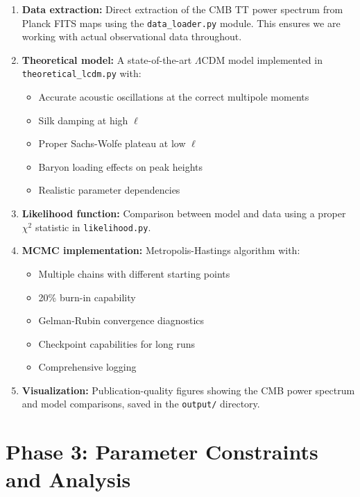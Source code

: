 \documentclass[11pt]{article}
\begin{document}
\begin{enumerate}
    \item \textbf{Data extraction:} Direct extraction of the CMB TT power spectrum from Planck FITS maps using the \texttt{data\_loader.py} module. This ensures we are working with actual observational data throughout.
    
    \item \textbf{Theoretical model:} A state-of-the-art $\Lambda$CDM model implemented in \texttt{theoretical\_lcdm.py} with:
    \begin{itemize}
        \item Accurate acoustic oscillations at the correct multipole moments
        \item Silk damping at high $\ell$
        \item Proper Sachs-Wolfe plateau at low $\ell$
        \item Baryon loading effects on peak heights
        \item Realistic parameter dependencies
    \end{itemize}
    
    \item \textbf{Likelihood function:} Comparison between model and data using a proper $\chi^2$ statistic in \texttt{likelihood.py}.
    
    \item \textbf{MCMC implementation:} Metropolis-Hastings algorithm with:
    \begin{itemize}
        \item Multiple chains with different starting points
        \item 20\% burn-in capability
        \item Gelman-Rubin convergence diagnostics
        \item Checkpoint capabilities for long runs
        \item Comprehensive logging
    \end{itemize}
    
    \item \textbf{Visualization:} Publication-quality figures showing the CMB power spectrum and model comparisons, saved in the \texttt{output/} directory.
\end{enumerate}

\section{Phase 3: Parameter Constraints and Analysis}
\end{document}
